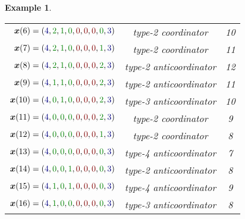 \documentclass[10 pt,twocolumn,journal]{IEEEtran}
\theoremstyle{plain}
\newtheorem{example}{Example}[] %
\newcommand{\x}{\bm{x}}
\theoremstyle{definition}
\begin{document}
\begin{example}
\begin{table}[ht]
\begin{center}
\begin{tabular}{|r|c|c|}
    $\x(6)=({\color{Myblue}4}, {\color{Mygreen}2}, {\color{Mygreen}1}, {\color{Mygreen}0}, {\color{Myred}0}, {\color{Myred}0}, {\color{Myred}0}, {\color{Mygreen}0}, {\color{Myblue}3})$ &  type-2 coordinator & 10\\ 
    $\x(7)=({\color{Myblue}4}, {\color{Mygreen}2}, {\color{Mygreen}1}, {\color{Mygreen}0}, {\color{Myred}0}, {\color{Myred}0}, {\color{Myred}0}, {\color{Mygreen}1}, {\color{Myblue}3})$ &  type-2 coordinator & 11\\ 
    $\x(8)=({\color{Myblue}4}, {\color{Mygreen}2}, {\color{Mygreen}1}, {\color{Mygreen}0}, {\color{Myred}0}, {\color{Myred}0}, {\color{Myred}0}, {\color{Mygreen}2}, {\color{Myblue}3})$ &  type-2 anticoordinator & 12 \\ 
    $\x(9)=({\color{Myblue}4}, {\color{Mygreen}1}, {\color{Mygreen}1}, {\color{Mygreen}0}, {\color{Myred}0}, {\color{Myred}0}, {\color{Myred}0}, {\color{Mygreen}2}, {\color{Myblue}3})$ &  type-2 anticoordinator& 11\\ 
    $\x(10)=({\color{Myblue}4}, {\color{Mygreen}0}, {\color{Mygreen}1}, {\color{Mygreen}0}, {\color{Myred}0}, {\color{Myred}0}, {\color{Myred}0}, {\color{Mygreen}2}, {\color{Myblue}3})$ &  type-3 anticoordinator& 10\\ 
    $\x(11)=({\color{Myblue}4}, {\color{Mygreen}0}, {\color{Mygreen}0}, {\color{Mygreen}0}, {\color{Myred}0}, {\color{Myred}0}, {\color{Myred}0}, {\color{Mygreen}2}, {\color{Myblue}3})$ &  type-2 coordinator& 9\\ 
    $\x(12)=({\color{Myblue}4}, {\color{Mygreen}0}, {\color{Mygreen}0}, {\color{Mygreen}0}, {\color{Myred}0}, {\color{Myred}0}, {\color{Myred}0}, {\color{Mygreen}1}, {\color{Myblue}3})$ &  type-2 coordinator& 8\\ 
    $\x(13)=({\color{Myblue}4}, {\color{Mygreen}0}, {\color{Mygreen}0}, {\color{Mygreen}0}, {\color{Myred}0}, {\color{Myred}0}, {\color{Myred}0}, {\color{Mygreen}0}, {\color{Myblue}3})$ &  type-4 anticoordinator& 7\\ 
    $\x(14)=({\color{Myblue}4}, {\color{Mygreen}0}, {\color{Mygreen}0}, {\color{Mygreen}1}, {\color{Myred}0}, {\color{Myred}0}, {\color{Myred}0}, {\color{Mygreen}0}, {\color{Myblue}3})$ &  type-2 anticoordinator& 8\\ 
    $\x(15)=({\color{Myblue}4}, {\color{Mygreen}1}, {\color{Mygreen}0}, {\color{Mygreen}1}, {\color{Myred}0}, {\color{Myred}0}, {\color{Myred}0}, {\color{Mygreen}0}, {\color{Myblue}3})$ &  type-4 anticoordinator & 9\\ 
    $\x(16)=({\color{Myblue}4}, {\color{Mygreen}1}, {\color{Mygreen}0}, {\color{Mygreen}0}, {\color{Myred}0}, {\color{Myred}0}, {\color{Myred}0}, {\color{Mygreen}0}, {\color{Myblue}3})$ &  type-3 anticoordinator& 8\\ 

\end{tabular}
\end{center}
\end{table}
\end{example}
\end{document}
